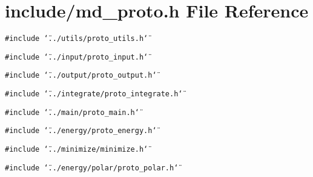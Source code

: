 \section{include/md\_\-proto.h File Reference}
\label{md__proto_8h}
{\tt \#include \char`\"{}../utils/proto\_\-utils.h\char`\"{}}\par
{\tt \#include \char`\"{}../input/proto\_\-input.h\char`\"{}}\par
{\tt \#include \char`\"{}../output/proto\_\-output.h\char`\"{}}\par
{\tt \#include \char`\"{}../integrate/proto\_\-integrate.h\char`\"{}}\par
{\tt \#include \char`\"{}../main/proto\_\-main.h\char`\"{}}\par
{\tt \#include \char`\"{}../energy/proto\_\-energy.h\char`\"{}}\par
{\tt \#include \char`\"{}../minimize/minimize.h\char`\"{}}\par
{\tt \#include \char`\"{}../energy/polar/proto\_\-polar.h\char`\"{}}\par
